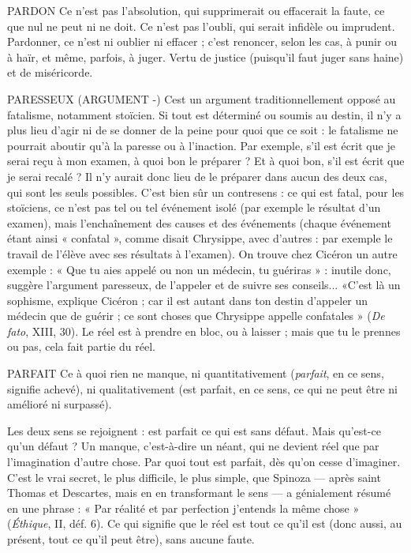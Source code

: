 PARDON Ce n’est pas l’absolution, qui supprimerait ou effacerait la faute,
ce que nul ne peut ni ne doit. Ce n’est pas l’oubli, qui serait infidèle
ou imprudent. Pardonner, ce n’est ni oublier ni effacer ; c’est renoncer,
selon les cas, à punir ou à haïr, et même, parfois, à juger. Vertu de justice
(puisqu'il faut juger sans haine) et de miséricorde.

PARESSEUX (ARGUMENT -) Cest un argument traditionnellement opposé
au fatalisme, notamment stoïcien. Si tout
est déterminé ou soumis au destin, il n’y a plus lieu d’agir ni de se donner de la
peine pour quoi que ce soit : le fatalisme ne pourrait aboutir qu’à la paresse ou
à l’inaction. Par exemple, s’il est écrit que je serai reçu à mon examen, à quoi
bon le préparer ? Et à quoi bon, s’il est écrit que je serai recalé ? Il n’y aurait
donc lieu de le préparer dans aucun des deux cas, qui sont les seuls possibles.
C'est bien sûr un contresens : ce qui est fatal, pour les stoïciens, ce n’est pas tel
ou tel événement isolé (par exemple le résultat d’un examen), mais l’enchaînement
des causes et des événements (chaque événement étant ainsi « confatal »,
comme disait Chrysippe, avec d’autres : par exemple le travail de l'élève avec ses
résultats à l’examen). On trouve chez Cicéron un autre exemple : « Que tu aies
appelé ou non un médecin, tu guériras » : inutile donc, suggère l'argument
paresseux, de l'appeler et de suivre ses conseils... «C’est là un sophisme,
explique Cicéron ; car il est autant dans ton destin d’appeler un médecin que
de guérir ; ce sont choses que Chrysippe appelle confatales » ({\it De fato}, XIII, 30).
Le réel est à prendre en bloc, ou à laisser ; mais que tu le prennes ou pas, cela
fait partie du réel.

PARFAIT Ce à quoi rien ne manque, ni quantitativement ({\it parfait}, en ce sens,
signifie achevé), ni qualitativement (est parfait, en ce sens, ce qui
ne peut être ni amélioré ni surpassé).

Les deux sens se rejoignent : est parfait ce qui est sans défaut. Mais qu’est-ce
qu’un défaut ? Un manque, c’est-à-dire un néant, qui ne devient réel que par
l'imagination d’autre chose. Par quoi tout est parfait, dès qu’on cesse d’imaginer.
C’est le vrai secret, le plus difficile, le plus simple, que Spinoza — après
saint Thomas et Descartes, mais en en transformant le sens — a génialement
résumé en une phrase : « Par réalité et par perfection j’entends la même chose »
({\it Éthique}, II, déf. 6). Ce qui signifie que le réel est tout ce qu’il est (donc aussi,
au présent, tout ce qu’il peut être), sans aucune faute.

